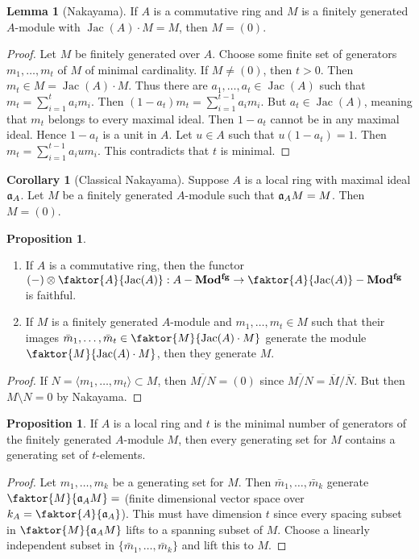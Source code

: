 \documentclass[10pt,letterpaper,cm]{nupset}
\theoremstyle{definition}
\theoremstyle{theorem}
\newtheorem{lemma}[definition]{Lemma}
\newtheorem{prop}[definition]{Proposition}
\newtheorem{corollary}[definition]{Corollary}
\theoremstyle{remark}
\newcommand{\1}{\mathbf{1}}
\newcommand{\0}{\vec 0}
\DeclareMathOperator{\Jac}{Jac}
\begin{document}
\begin{lemma}[Nakayama]
If $A$ is a commutative ring and $M$ is a finitely generated $A$-module with $\Jac(A) \cdot M = M$, then $M= (0)$.
\end{lemma}
\begin{proof}
Let $M$ be finitely generated over $A$. Choose some finite set of generators $m_1, \ldots, m_t$ of $M$ of minimal cardinality. If $M\ne (0)$, then $t>0$. Then $m_t \in M = \Jac(A)\cdot M$. Thus there are $a_1, \ldots, a_t \in \Jac(A)$ such that $m_t = \sum_{i=1}^t a_im_i$. Then $(1-a_t)m_t = \sum_{i=1}^{t-1} a_im_i$. But $a_t \in \Jac(A)$, meaning that $m_t$ belongs to every maximal ideal. Then $1-a_t$ cannot be in any maximal ideal. Hence $1-a_t$ is a unit in $A$. Let $u\in A$ such that $u(1-a_t) = 1$. Then $m_t = \sum_{i=1}^{t-1} a_iu m_i$. This contradicts that $t$ is minimal.
\end{proof}

\begin{corollary}[Classical Nakayama]
Suppose $A$ is a local ring with maximal ideal $\frak{a}_A$. Let $M$ be a finitely generated $A$-module such that $\frak{a}_AM = M$. Then $M= (0)$. 
\end{corollary}

\begin{prop} $ $
\begin{enumerate}
\item If $A$ is a commutative ring,  then the functor $(-) \otimes \faktor{A}{\Jac(A)} : A-\mathbf{Mod^{fg}} \to \faktor{A}{\Jac(A)} - \mathbf{Mod^{fg}}$ is faithful.  
\item If $M$ is a finitely generated $A$-module and $m_1, \ldots, m_t \in M$ such that their images $\bar{m}_1, \ldots, \bar{m}_t \in \faktor{M}{\Jac(A) \cdot M}$ generate the module $\faktor{M}{\Jac(A)\cdot M}$, then they generate $M$.
\end{enumerate}
\end{prop}
\begin{proof}
If $N = \langle m_1, \ldots, m_t \rangle \subset M$, then $\overline{M/N} = (0)$ since $\overline{M/N} = \overline{M}/\overline{N}$. But then $M \setminus N = 0$ by Nakayama. 
\end{proof}

\begin{prop}
If $A$ is a local ring and $t$ is the minimal number of generators of the finitely generated $A$-module $M$, then every generating set for $M$ contains a generating set of $t$-elements. 
\end{prop}
\begin{proof}
Let $m_1, \ldots, m_k$ be a generating set for $M$. Then $\bar{m}_1, \ldots, \bar{m}_k$ generate $\faktor{M}{\frak{a}_A M} =$ (finite dimensional vector space over $k_A = \faktor{A}{\frak{a}_A}$). This must have dimension $t$ since every spacing subset in $\faktor{M}{\frak{a}_A M}$ lifts to a spanning subset of $M$. Choose a linearly independent subset in $\{\bar{m}_1, \ldots, \bar{m}_k\}$ and lift this to $M$.
\end{proof}
\end{document}
